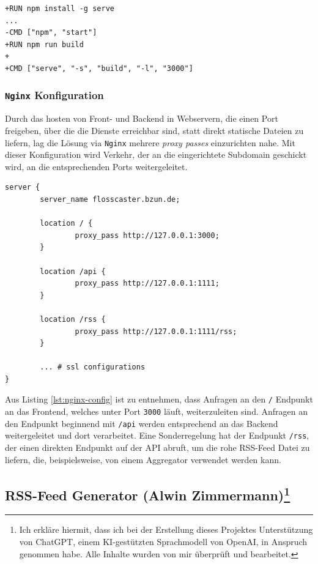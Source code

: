 \documentclass{article}
\begin{document}
\begin{lstlisting}[caption=Unterschiede im Frontend Dockerfile]
+RUN npm install -g serve
...
-CMD ["npm", "start"]
+RUN npm run build
+
+CMD ["serve", "-s", "build", "-l", "3000"]
\end{lstlisting}

\subsubsection{\texttt{Nginx} Konfiguration}
Durch das hosten von Front- und Backend in Webservern, die einen Port freigeben, über die die Dienste erreichbar sind, statt direkt statische Dateien zu liefern, lag die Lösung via \texttt{Nginx} mehrere \textit{proxy passes} einzurichten nahe. Mit dieser Konfiguration wird Verkehr, der an die eingerichtete Subdomain geschickt wird, an die entsprechenden Ports weitergeleitet.

\begin{lstlisting}[label=lst:nginx-config, caption=\texttt{Nginx} \textit{proxy pass} Konfiguration]
server {
        server_name flosscaster.bzun.de;

        location / {
                proxy_pass http://127.0.0.1:3000;
        }

        location /api {
                proxy_pass http://127.0.0.1:1111;
        }

        location /rss {
                proxy_pass http://127.0.0.1:1111/rss;
        }

        ... # ssl configurations
}
\end{lstlisting}

Aus Listing \ref{lst:nginx-config} ist zu entnehmen, dass Anfragen an den \texttt{/} Endpunkt an das Frontend, welches unter Port \texttt{3000} läuft, weiterzuleiten sind. Anfragen an den Endpunkt beginnend mit \texttt{/api} werden entsprechend an das Backend weitergeleitet und dort verarbeitet. Eine Sonderregelung hat der Endpunkt \texttt{/rss}, der einen direkten Endpunkt auf der API abruft, um die rohe RSS-Feed Datei zu liefern, die, beispielsweise, von einem Aggregator verwendet werden kann. 


\subsection[RSS-Feed Generator \small{(Alwin Zimmermann)}]{RSS-Feed Generator \small{(Alwin Zimmermann)\footnote{Ich erkläre hiermit, dass ich bei der Erstellung dieses Projektes Unterstützung von ChatGPT, einem KI-gestützten Sprachmodell von OpenAI, in Anspruch genommen habe. Alle Inhalte wurden von mir überprüft und bearbeitet.}}}
\end{document}
